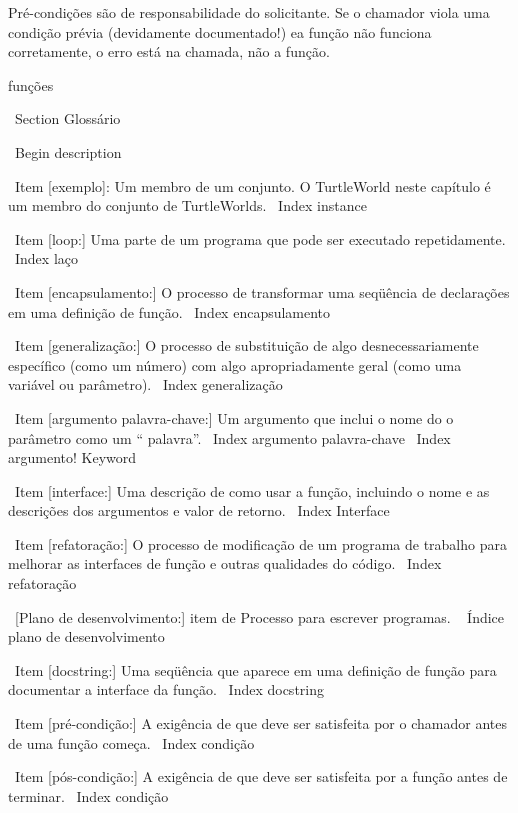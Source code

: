 \documentclass[10pt]{book}
\begin{document}
{Pré-condições são de responsabilidade do solicitante. Se o chamador
viola uma condição prévia (devidamente documentado!) ea função
não funciona corretamente, o erro está na chamada, não a função.

funções%


\ Section {} Glossário

\ Begin {description}

\ Item [exemplo]: Um membro de um conjunto. O TurtleWorld neste
capítulo é um membro do conjunto de TurtleWorlds.
\ Index {instance}

\ Item [loop:] Uma parte de um programa que pode ser executado repetidamente.
\ Index {laço}

\ Item [encapsulamento:] O processo de transformar uma seqüência de
declarações em uma definição de função.
\ Index {} encapsulamento

\ Item [generalização:] O processo de substituição de algo
desnecessariamente específico (como um número) com algo apropriadamente
geral (como uma variável ou parâmetro).
\ Index {generalização}

\ Item [argumento palavra-chave:] Um argumento que inclui o nome do
o parâmetro como um `` palavra''.
\ Index {argumento palavra-chave}
\ Index {argumento! Keyword}

\ Item [interface:] Uma descrição de como usar a função, incluindo
o nome e as descrições dos argumentos e valor de retorno.
\ Index {Interface}

\ Item [refatoração:] O processo de modificação de um programa de trabalho para
  melhorar as interfaces de função e outras qualidades do código.
\ Index {} refatoração

\ [Plano de desenvolvimento:] item de Processo para escrever programas.
\ {} Índice plano de desenvolvimento

\ Item [docstring:] Uma seqüência que aparece em uma definição de função
para documentar a interface da função.
\ Index {} docstring

\ Item [pré-condição:] A exigência de que deve ser satisfeita por
o chamador antes de uma função começa.
\ Index {condição}

\ Item [pós-condição:] A exigência de que deve ser satisfeita por
a função antes de terminar.
\ Index {condição}

}
\end{document}
